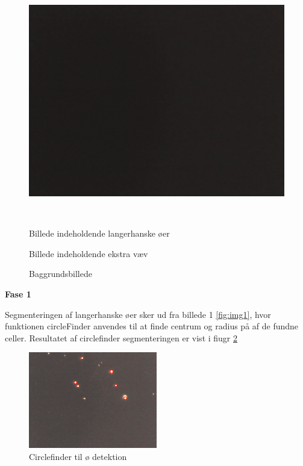 \begin{figure}[htbp]
\begin{minipage}[b]{0.3\textwidth}
\includegraphics[width=1.00\textwidth]{billeder/software/3.jpg} %
\end{minipage} \\  %
\begin{minipage}[t]{0.3\textwidth}
\caption{Billede indeholdende langerhanske øer} %
\label{fig:img1}
\end{minipage} \hfill
\begin{minipage}[t]{0.3\textwidth}
\caption{Billede indeholdende ekstra væv} %
\label{fig:img2}
\end{minipage}
\hfill
\begin{minipage}[t]{0.3\textwidth}
\caption{Baggrundsbillede} %
\label{fig:img3}
\end{minipage}
\end{figure}

\textbf{Fase 1}

Segmenteringen af langerhanske øer sker ud fra billede 1 \ref{fig:img1}, hvor funktionen circleFinder anvendes til at finde centrum og radius på af de fundne celler. Resultatet af circlefinder segmenteringen er vist i fiugr \ref{fig:circlefinder}

 \begin{figure}[H]
	\centering
	\includegraphics[width=0.5\textwidth]{billeder/software/circlefinder.png}
	\caption{Circlefinder til ø detektion}
	\label{fig:circlefinder}
\end{figure}

